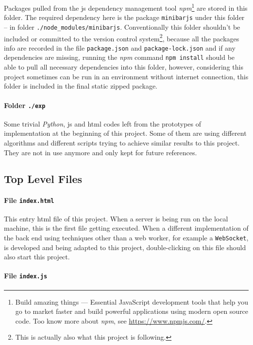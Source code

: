 Packages pulled from the \gls{js} dependency management tool \emph{npm}\footnote{ Build amazing things --- Essential JavaScript development tools that help you go to market faster and build powerful applications using modern open source code\cite{bib:npm:npm}. Too know more about \emph{npm}, see \url{https://www.npmjs.com/}.} are stored in this folder. The required dependency here is the package \texttt{minibarjs} under this folder -- in folder \texttt{./node\_modules/minibarjs}. Conventionally this folder shouldn't be included or committed to the version control system\footnote{ This is actually also what this project is following. }, because all the packages info are recorded in the file \texttt{package.json} and \texttt{package-lock.json} and if any dependencies are missing, running the \emph{npm} command \texttt{npm install} should be able to pull all necessary dependencies into this folder, however, considering this project sometimes can be run in an environment without internet connection, this folder is included in the final static zipped package.

\paragraph{Folder \texttt{./exp}}

Some trivial \emph{Python}, \gls{js} and \gls{html} codes left from the prototypes of implementation at the beginning of this project. Some of them are using different algorithms and different scripts trying to achieve similar results to this project. They are not in use anymore and only kept for future references.

\subsection{Top Level Files}

\paragraph{File \texttt{index.html}}

This entry \gls{html} file of this project. When a server is being run on the local machine, this is the first file getting executed. When a different implementation of the back end using techniques other than a web worker, for example a \texttt{WebSocket}, is developed and being adapted to this project, double-clicking on this file should also start this project.

\paragraph{File \texttt{index.js}}

